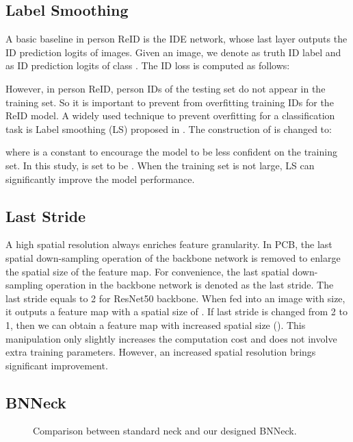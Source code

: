 \documentclass[journal]{IEEEtran}
\begin{document}
\subsection{Label Smoothing}
A basic baseline in person ReID is the IDE \cite{zheng2018discriminatively} network, whose last layer outputs the ID prediction logits of images.
Given an image, we denote  as truth ID label and  as ID prediction logits of class .
The ID loss is computed as follows:


However, in person ReID, person IDs of the testing set do not appear in the training set.
So it is important to prevent from overfitting training IDs for the ReID model.
A widely used technique to prevent overfitting for a classification task is Label smoothing (LS) proposed in \cite{szegedy2016rethinking}.
The construction of  is changed to:

where  is a constant to encourage the model to be less confident on the training set.
In this study,  is set to be .
When the training set is not large, LS can significantly improve the model performance.

\subsection{Last Stride}
A high spatial resolution always enriches feature granularity.
In PCB\cite{sun2018beyond}, the last spatial down-sampling operation of the backbone network is removed to enlarge the spatial size of the feature map.
For convenience, the last spatial down-sampling operation in the backbone network is denoted as the last stride.
The last stride equals to 2 for ResNet50 backbone. When fed into an image with  size, it outputs a feature map with a spatial size of .
If last stride is changed from 2 to 1, then we can obtain a feature map with increased spatial size ().
This manipulation only slightly increases the computation cost and does not involve extra training parameters.
However, an increased spatial resolution brings significant improvement.

\subsection{BNNeck}

\begin{figure}[htb]
\vspace{-3mm}
\centering
{}

\vspace{-3mm}
\centering
{}\caption{Comparison between standard neck and our designed BNNeck.}\label{fig:bnneck}
\end{figure}
\end{document}
